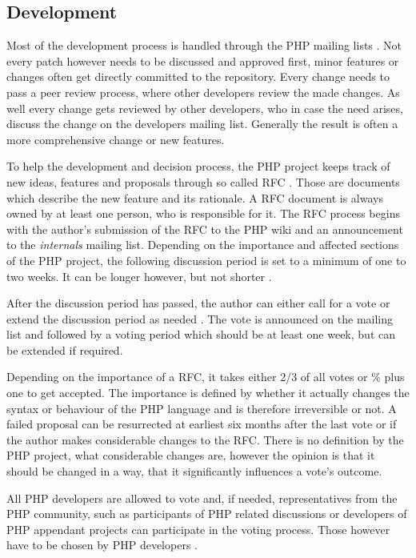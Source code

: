 
\subsection{Development} %

Most of the development process is handled through the PHP mailing lists
\cite{PHPRelease,Magnusson2010,PHPVoting}. Not every patch however needs to be
discussed and approved first, minor features or changes often get directly
committed to the repository. Every change needs to pass a peer review process,
where other developers review the made changes. As well every change gets
reviewed by other developers, who in case the need arises, discuss the change
on the developers mailing list. Generally the result is often a more
comprehensive change or new features.

To help the development and decision process, the PHP project keeps track of
new ideas, features and proposals through so called \ac{RFC} \cite{PHPRFC}.
Those are documents which describe the new feature and its rationale. A
\ac{RFC} document is always owned by at least one person, who is responsible
for it. The \ac{RFC} process begins with the author's submission of the
\ac{RFC} to the PHP wiki and an announcement to the \emph{internals} mailing
list. Depending on the importance and affected sections of the PHP project, the
following discussion period is set to a minimum of one to two weeks. It can be
longer however, but not shorter \cite{PHPVoting}.

After the discussion period has passed, the author can either call for a vote
or extend the discussion period as needed \cite{PHPVoting}. The vote is
announced on the mailing list and followed by a voting period which should be
at least one week, but can be extended if required.

Depending on the importance of a \ac{RFC}, it takes either 2/3 of all votes or
\unit[50]{\%} plus one to get accepted. The importance is defined by whether it
actually changes the syntax or behaviour of the PHP language and is therefore
irreversible or not. A failed proposal can be resurrected at earliest six
months after the last vote or if the author makes considerable changes to the
\ac{RFC}. There is no definition by the PHP project, what considerable changes
are, however the opinion is that it should be changed in a way, that it
significantly influences a vote's outcome.

All PHP developers are allowed to vote and, if needed, representatives from the
PHP community, such as participants of PHP related discussions or developers of
PHP appendant projects can participate in the voting process. Those however
have to be chosen by PHP developers \cite{PHPWhoVote}.

